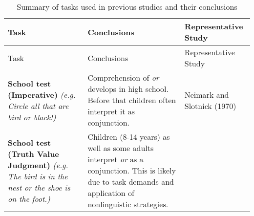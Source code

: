 \documentclass[
  english,
  ,man,floatsintext]{apa6}
\begin{document}
\begin{longtable}[]{@{}lll@{}}
\caption{\label{tab:conclusionsReview} Summary of tasks used in previous studies and their conclusions}\tabularnewline
\toprule
\begin{minipage}[b]{0.35\columnwidth}\raggedright
Task\strut
\end{minipage} & \begin{minipage}[b]{0.40\columnwidth}\raggedright
Conclusions\strut
\end{minipage} & \begin{minipage}[b]{0.17\columnwidth}\raggedright
Representative Study\strut
\end{minipage}\tabularnewline
\midrule
\endfirsthead
\toprule
\begin{minipage}[b]{0.35\columnwidth}\raggedright
Task\strut
\end{minipage} & \begin{minipage}[b]{0.40\columnwidth}\raggedright
Conclusions\strut
\end{minipage} & \begin{minipage}[b]{0.17\columnwidth}\raggedright
Representative Study\strut
\end{minipage}\tabularnewline
\midrule
\endhead
\begin{minipage}[t]{0.35\columnwidth}\raggedright
\textbf{School test (Imperative)} \newline \textit{(e.g. Circle all that are bird or black!)}\strut
\end{minipage} & \begin{minipage}[t]{0.40\columnwidth}\raggedright
Comprehension of \emph{or} develops in high school. Before that children often interpret it as conjunction.\strut
\end{minipage} & \begin{minipage}[t]{0.17\columnwidth}\raggedright
Neimark and Slotnick (1970)\strut
\end{minipage}\tabularnewline
\begin{minipage}[t]{0.35\columnwidth}\raggedright
\textbf{School test (Truth Value Judgment)} \newline \textit{(e.g. The bird is in the nest or the shoe is on the foot.)}\strut
\end{minipage} & \begin{minipage}[t]{0.40\columnwidth}\raggedright
Children (8-14 years) as well as some adults interpret \emph{or} as a conjunction. This is likely due to task demands and application of nonlinguistic strategies.\strut
\end{minipage} & \begin{minipage}[t]{0.17\columnwidth}\raggedright

\end{minipage}
\end{longtable}
\end{document}
